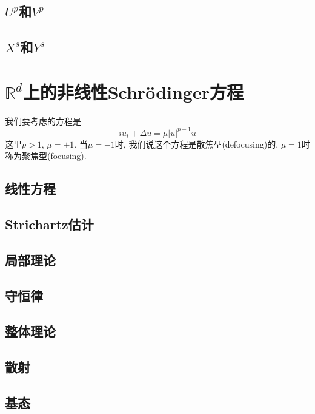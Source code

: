\documentclass{ctexbook}
\theoremstyle{definition}
\theoremstyle{remark}
\begin{document}
\section{$U^p$和$V^p$}
\section{$X^s$和$Y^s$}

\chapter{$\mathbb{R}^d$上的非线性Schr\"odinger方程}
我们要考虑的方程是
$$iu_t+\Delta u=\mu|u|^{p-1}u$$
这里$p>1$, $\mu=\pm1$. 当$\mu=-1$时, 我们说这个方程是散焦型(defocusing)的, $\mu=1$时称为聚焦型(focusing). 
\section{线性方程}
\section{Strichartz估计}
\section{局部理论}
\section{守恒律}
\section{整体理论}
\section{散射}
\section{基态}
\end{document}

